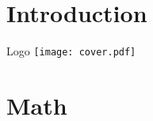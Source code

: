 \documentclass[
    ref = refDemo,
    style = 2
]{spBeamer}
\begin{document}
    \section{Introduction}
        \begin{frame}{Logo}
                \texttt{[image: cover.pdf]}
        \end{frame}

    \section{Math}
    
\end{document}
